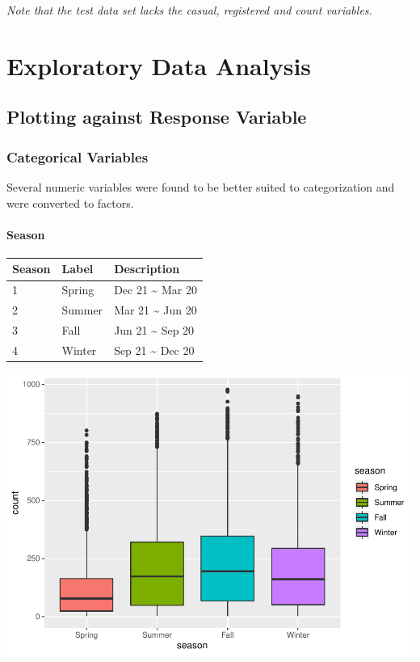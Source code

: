 \documentclass[american,]{article}
\let\oldparagraph\paragraph
\renewcommand{\paragraph}[1]{\oldparagraph{#1}\mbox{}}
\begin{document}
\emph{Note that the test data set lacks the casual, registered and count variables.}

\newpage

\hypertarget{exploratory-data-analysis}{%
\section{Exploratory Data Analysis}\label{exploratory-data-analysis}}

\hypertarget{plotting-against-response-variable}{%
\subsection{Plotting against Response Variable}\label{plotting-against-response-variable}}

\hypertarget{categorical-variables}{%
\subsubsection{Categorical Variables}\label{categorical-variables}}

Several numeric variables were found to be better suited to categorization and were converted to factors.

\hypertarget{season}{%
\paragraph{Season}\label{season}}

\begin{longtable}[]{@{}lll@{}}
\toprule
Season & Label & Description\tabularnewline
\midrule
\endhead
1 & Spring & Dec 21 \textasciitilde{} Mar 20\tabularnewline
2 & Summer & Mar 21 \textasciitilde{} Jun 20\tabularnewline
3 & Fall & Jun 21 \textasciitilde{} Sep 20\tabularnewline
4 & Winter & Sep 21 \textasciitilde{} Dec 20\tabularnewline
\bottomrule
\end{longtable}

\includegraphics{BikeSharingDemand_files/figure-latex/train.mod.1.season-1.pdf}
\end{document}
